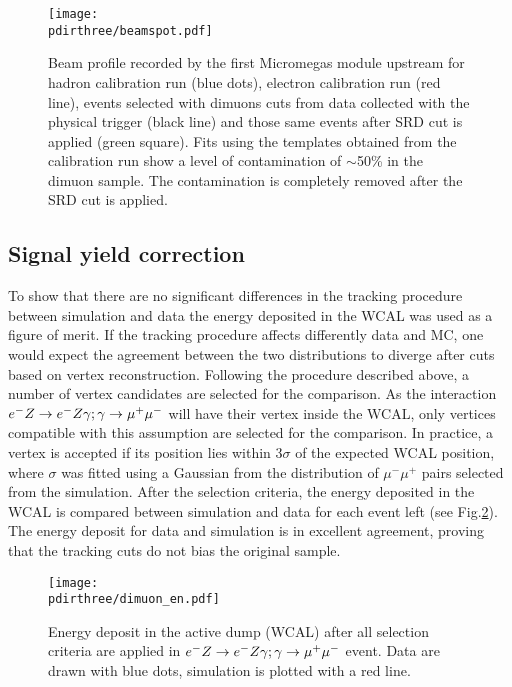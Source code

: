 \begin{figure}[tbh!]
  \begin{center}
    \texttt{[image: \\pdirthree/beamspot.pdf]}
  \end{center}
  \caption[Beam profile with different cuts]{Beam profile recorded by the first Micromegas module upstream for hadron calibration run (blue dots), electron calibration run (red line), events selected with dimuons cuts from data collected with the physical trigger (black line) and those same events after SRD cut is applied (green square). Fits using the templates obtained from the calibration run show a level of contamination of $\sim$50\% in the dimuon sample. The contamination is completely removed after the SRD cut is applied.}
  \label{fig:dimuon:profile}
\end{figure}


\subsection{Signal yield correction}
\label{ch3:sec:dimuons-sig-corr}

To show that there are no significant differences in the tracking procedure between simulation and data the energy deposited in the WCAL was used as a figure of merit. If the tracking procedure affects differently data and MC, one would expect the agreement between the two distributions to diverge after cuts based on vertex reconstruction. Following the procedure described above, a number of vertex candidates are selected for the comparison. As the interaction $\emu$ will have their vertex inside the WCAL, only vertices compatible with this assumption are selected for the comparison. In practice, a vertex is accepted if its position lies within 3$\sigma$ of the expected WCAL position, where $\sigma$ was fitted using a Gaussian from the distribution of $\mu^- \mu^+$ pairs selected from the simulation. After the selection criteria, the energy deposited in the WCAL is compared between simulation and data for each event left (see Fig.\ref{fig:dimuon_en}). The energy deposit for data and simulation is in excellent agreement, proving that the tracking cuts do not bias the original sample.

\begin{figure}[tbh!]
  \begin{center}
    \texttt{[image: \\pdirthree/dimuon\_en.pdf]}    
  \end{center}
  \caption[$\emu$ MC-DATA comparison]{Energy deposit in the active dump (WCAL) after all selection criteria are applied in $\emu$ event. Data are drawn with blue dots, simulation is plotted with a red line. }
  \label{fig:dimuon_en}
\end{figure}

